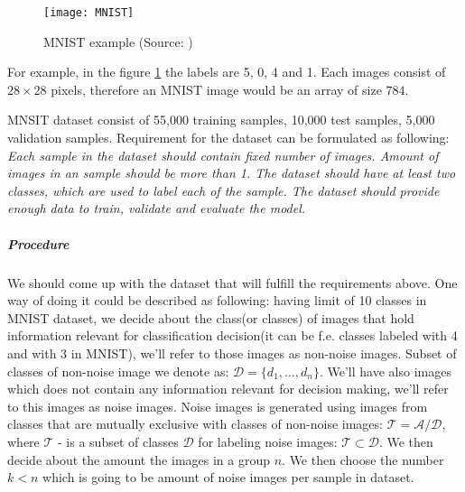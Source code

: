\begin{figure}[h!]
	\texttt{[image: MNIST]}
	\caption{MNIST example (Source: \cite{tensorFlowSite})}
	\label{fig:mnist}
\end{figure}

For example, in the figure \ref{fig:mnist} the labels are 5, 0, 4 and 1.
Each images consist of $28\times28$ pixels, therefore an MNIST image would
be an array of size $784$.

MNSIT dataset consist of 55,000 training samples, 10,000 test samples, 5,000 validation samples.
Requirement for the dataset can be formulated as following:\\
\textit{Each sample in the dataset should contain fixed number of images. Amount of images
in an sample should be more than 1. The dataset should have at least two classes,
which are used to label each of the sample. The dataset should provide enough
data to train, validate and evaluate the model.}



\subparagraph{Procedure}
We should come up with the dataset that will fulfill the requirements above.
One way of doing it could be described as following:
having limit of 10 classes in MNIST dataset, we decide about the class(or classes) of images
that hold information relevant for classification decision(it can be f.e. classes
labeled with 4 and with 3 in MNIST),
we'll refer to those images as non-noise images. Subset of classes of non-noise image
we denote as: $\mathcal{D} = \{d_1,..., d_n\}$.
We'll have also images which does not
contain any information relevant for decision making, we'll refer to this images
as noise images. Noise images is generated using images from classes that
are mutually exclusive with classes of non-noise images:
$\mathcal{T} = \mathcal{A} / \mathcal{D}$, where $\mathcal{T}$ - is a subset of classes $\mathcal{D}$
for labeling noise images: $\mathcal{T}\subset \mathcal{D}$.
We then decide about the amount the images in a group $n$.
We then choose the number $k < n $ which is going to be amount of noise images
per sample in dataset.


